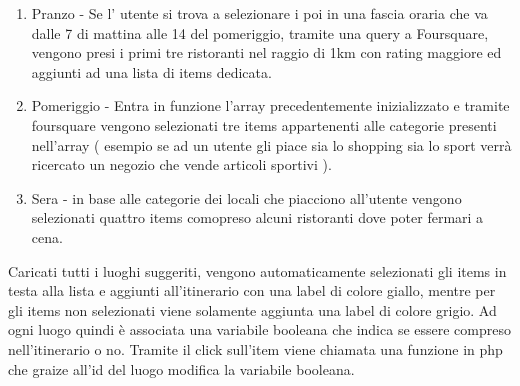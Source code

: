 \begin{enumerate}
\item Pranzo - Se l' utente si trova a selezionare i poi in una fascia oraria che va dalle 7 di mattina alle 14 del pomeriggio, tramite una query a Foursquare, vengono presi i primi tre ristoranti nel raggio di 1km con rating maggiore ed aggiunti ad una lista di items dedicata.

\item Pomeriggio - Entra in funzione l'array precedentemente inizializzato e tramite foursquare vengono selezionati tre items appartenenti alle categorie presenti nell'array ( esempio se ad un utente gli piace sia lo shopping sia lo sport verrà ricercato un negozio che vende articoli sportivi ).
\item Sera - in base alle categorie dei locali che piacciono all'utente vengono selezionati quattro items comopreso alcuni ristoranti dove poter fermari a cena.
\end{enumerate}

 
Caricati tutti i luoghi suggeriti, vengono automaticamente selezionati gli items in testa alla lista e aggiunti all'itinerario con una label di colore giallo, mentre per  gli items non selezionati viene solamente aggiunta una label di colore grigio.
Ad ogni luogo quindi è associata una variabile booleana che indica se essere compreso nell'itinerario o no.
Tramite il click sull'item viene chiamata una funzione in php che graize all'id del luogo modifica la variabile booleana.
 




